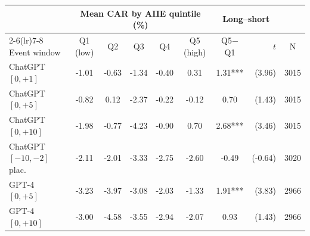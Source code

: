 \begin{tabular}{lccccccrc}
\toprule
& \multicolumn{5}{c}{Mean CAR by AIIE quintile (\%)} & \multicolumn{2}{c}{Long--short} & \\
\cmidrule(lr){2-6}\cmidrule(lr){7-8}
Event window & Q1 (low) & Q2 & Q3 & Q4 & Q5 (high) & Q5$-$Q1 & $t$ & N \\
\midrule
ChatGPT $[0,+1]$ & -1.01 & -0.63 & -1.34 & -0.40 & 0.31 & 1.31*** & (3.96) & 3015 \\
ChatGPT $[0,+5]$ & -0.82 & 0.12 & -2.37 & -0.22 & -0.12 & 0.70 & (1.43) & 3015 \\
ChatGPT $[0,+10]$ & -1.98 & -0.77 & -4.23 & -0.90 & 0.70 & 2.68*** & (3.46) & 3015 \\
ChatGPT $[-10,-2]$ plac. & -2.11 & -2.01 & -3.33 & -2.75 & -2.60 & -0.49 & (-0.64) & 3020 \\
GPT-4 $[0,+5]$ & -3.23 & -3.97 & -3.08 & -2.03 & -1.33 & 1.91*** & (3.83) & 2966 \\
GPT-4 $[0,+10]$ & -3.00 & -4.58 & -3.55 & -2.94 & -2.07 & 0.93 & (1.43) & 2966 \\
\bottomrule
\end{tabular}